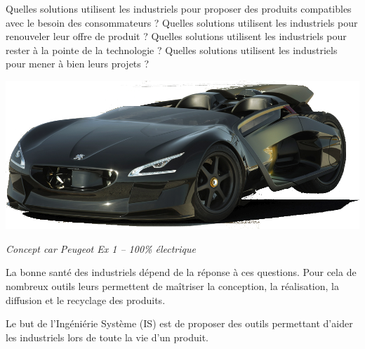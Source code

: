 \documentclass[11pt,oneside]{article}
\begin{document}
 
\noindent \begin{minipage}[c]{.55\linewidth}

\indent Quelles solutions utilisent les industriels pour proposer des produits compatibles avec le besoin des consommateurs ? Quelles solutions utilisent les industriels pour renouveler leur offre de produit ? Quelles solutions utilisent les industriels pour rester à la pointe de la technologie ? Quelles solutions utilisent les industriels pour mener à bien leurs projets ?

\end{minipage}
\begin{minipage}[c]{.4\linewidth}
\begin{center}
\includegraphics[width=.9\textwidth]{png/cc_ex1}

\textit{Concept car Peugeot Ex 1 \cite{cc_ex1} -- 100\% électrique}
\end{center}
\end{minipage}

\vspace{.5cm}

La bonne santé des industriels dépend de la réponse à ces questions. Pour cela de nombreux outils leurs permettent de maîtriser la conception, la réalisation, la diffusion et le recyclage des produits. 

Le but de l'Ingéniérie Système (IS) est de proposer des outils permettant d'aider les industriels lors de toute la vie d'un produit. 
\end{document}
